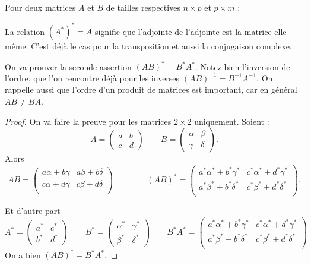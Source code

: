 \documentclass[11pt,class=report,crop=false]{standalone}
\begin{document}
\begin{proposition}
  Pour deux matrices $A$ et $B$ de tailles respectives
  $n \times p$ et $p \times m$ : ~
\end{proposition}

La relation $(A^*)^*=A$ signifie  que l'adjointe de l'adjointe est la matrice elle-même.
C'est déjà le cas pour la transposition et aussi la conjugaison complexe.

On va prouver la seconde assertion $(AB)^* = B^* A^*$. Notez bien l'inversion de l'ordre, que l'on rencontre déjà pour les inverses $(AB)^{-1} = B^{-1}A^{-1}$.
On rappelle aussi que l'ordre d'un produit de matrices est important, car en général $AB \neq BA$.


\begin{proof}
On va faire la preuve pour les matrices $2\times2$ uniquement.
Soient :
$$A = \begin{pmatrix}a&b\\c&d\end{pmatrix}
\qquad
B = \begin{pmatrix}\alpha&\beta\\\gamma&\delta\end{pmatrix}.$$
Alors
$$AB = \begin{pmatrix}
a\alpha+b\gamma & a\beta+b\delta \\
c\alpha+d\gamma & c\beta+d\delta \\ 
\end{pmatrix}
\qquad\qquad
(AB)^* = \begin{pmatrix}
a^*\alpha^*+b^*\gamma^* & c^*\alpha^*+d^*\gamma^* \\
a^*\beta^*+b^*\delta^* & c^*\beta^*+d^*\delta^* \\ 
\end{pmatrix}.
$$

Et d'autre part 
$$A^* = \begin{pmatrix}a^*&c^*\\b^*&d^*\end{pmatrix}
\qquad
B^* = \begin{pmatrix}\alpha^*&\gamma^*\\\beta^*&\delta^*\end{pmatrix}
\qquad
B^* A^* = \begin{pmatrix}
a^*\alpha^*+b^*\gamma^* & c^*\alpha^*+d^*\gamma^* \\
a^*\beta^*+b^*\delta^* & c^*\beta^*+d^*\delta^* \\ 
\end{pmatrix}$$
On a bien $(AB)^* = B^* A^*$.
\end{proof}
\end{document}
